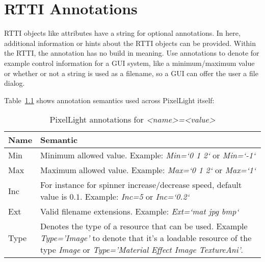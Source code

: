 \chapter{RTTI Annotations}
\label{Appendix:RTTIAnnotations}
RTTI objects like attributes have a string for optional annotations. In here, additional information or hints about the RTTI objects can be provided. Within the RTTI, the annotation has no build in meaning. Use annotations to denote for example control information for a GUI system, like a minimum/maximum value or whether or not a string is used as a filename, so a GUI can offer the user a file dialog.

Table~\ref{Table:PixelLightAnnotations} shows annotation semantics used across PixelLight itself:
\begin{table}[htb]
	\centering
	\begin{tabular}{|l|p{}|}
		\hline
		\textbf{Name} & \textbf{Semantic}\\
		\hline
		\hline
		Min  & Minimum allowed value. Example: \emph{Min=`0 1 2`} or \emph{Min=`-1`}\\
		\hline
		Max  & Maximum allowed value. Example: \emph{Max=`0 1 2`} or \emph{Max=`1`}\\
		\hline
		Inc  & For instance for spinner increase/decrease speed, default value is $0.1$. Example: \emph{Inc=5} or \emph{Inc=`0.2`}\\
		\hline
		Ext  & Valid filename extensions. Example: \emph{Ext=`mat jpg bmp`}\\
		\hline
		Type & Denotes the type of a resource that can be used. Example \emph{Type='Image'} to denote that it's a loadable resource of the type \emph{Image} or \emph{Type='Material Effect Image TextureAni'}.\\
		\hline
	\end{tabular} 
	\caption{PixelLight annotations for \emph{<name>=<value>}}
	\label{Table:PixelLightAnnotations}
\end{table}
